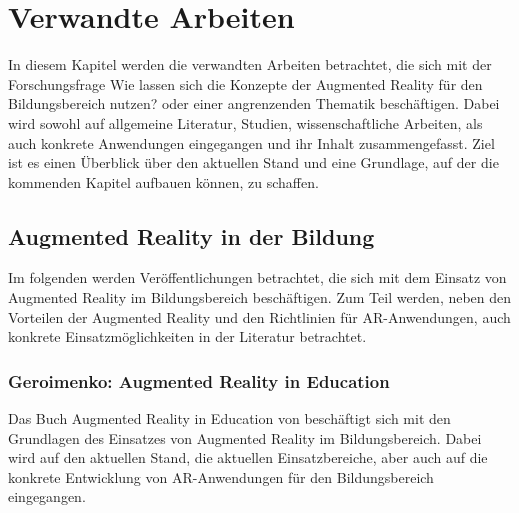 \chapter{Verwandte Arbeiten}\label{chapter:arbeiten}
In diesem Kapitel werden die verwandten Arbeiten betrachtet, die sich mit der Forschungsfrage \glqq Wie lassen sich die Konzepte der Augmented Reality für den Bildungsbereich nutzen?\grqq{} oder einer angrenzenden Thematik beschäftigen. Dabei wird sowohl auf allgemeine Literatur, Studien, wissenschaftliche Arbeiten, als auch konkrete Anwendungen eingegangen und ihr Inhalt zusammengefasst. Ziel ist es einen Überblick über den aktuellen Stand und eine Grundlage, auf der die kommenden Kapitel aufbauen können, zu schaffen.\\

\section{Augmented Reality in der Bildung}
Im folgenden werden Veröffentlichungen betrachtet, die sich mit dem Einsatz von Augmented Reality im Bildungsbereich beschäftigen. Zum Teil werden, neben den Vorteilen der Augmented Reality und den Richtlinien für AR-Anwendungen, auch konkrete Einsatzmöglichkeiten in der Literatur betrachtet.

\subsection{Geroimenko: Augmented Reality in Education}\label{sec:geroimenko-education}
Das Buch \glqq Augmented Reality in Education\grqq{} von \citeauthor{geroimenko:ar-in-education} beschäftigt sich mit den Grundlagen des Einsatzes von Augmented Reality im Bildungsbereich. Dabei wird auf den aktuellen Stand, die aktuellen Einsatzbereiche, aber auch auf die konkrete Entwicklung von AR-Anwendungen für den Bildungsbereich eingegangen. 

